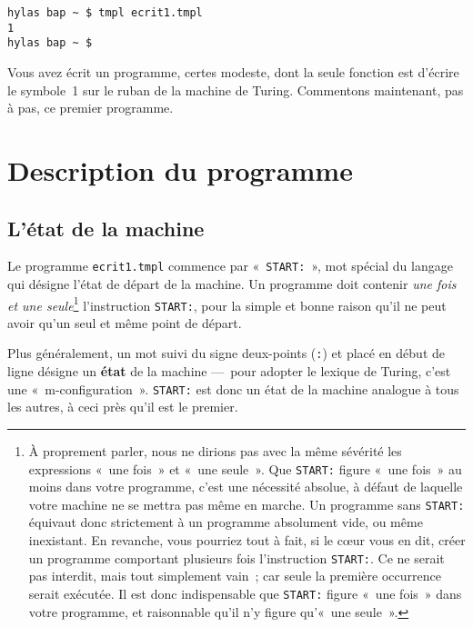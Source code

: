 \documentclass[a4paper, 11pt]{report}
\begin{document}
\begin{verbatim}
hylas bap ~ $ tmpl ecrit1.tmpl
1
hylas bap ~ $
\end{verbatim}

\par

Vous avez écrit un programme, certes modeste, dont la seule fonction est
d'écrire le symbole~1 sur le ruban de la machine de Turing.  Commentons
maintenant, pas à pas, ce premier programme.



\section{Description du programme}

\subsection{L'état de la machine}

Le programme \texttt{ecrit1.tmpl} commence par «~\verb+START:+~», mot
spécial du langage qui désigne l'état de départ de la machine. Un
programme doit contenir \emph{une fois et une seule}\footnote{À
  proprement parler, nous ne dirions pas avec la même sévérité les
  expressions «~une fois~» et «~une seule~». Que \texttt{START:} figure
  «~une fois~» au moins dans votre programme, c'est une nécessité
  absolue, à défaut de laquelle votre machine ne se mettra pas même en
  marche. Un programme sans \texttt{START:} équivaut donc strictement à
  un programme absolument vide, ou même inexistant. En revanche, vous
  pourriez tout à fait, si le cœur vous en dit, créer un programme
  comportant plusieurs fois l'instruction \texttt{START:}. Ce ne serait
  pas interdit, mais tout simplement vain~; car seule la première
  occurrence serait exécutée. Il est donc indispensable que
  \texttt{START:} figure «~une fois~» dans votre programme, et
  raisonnable qu'il n'y figure qu'«~une seule~».} l'instruction
\verb+START:+, pour la simple et bonne raison qu'il ne peut avoir qu'un
seul et même point de départ.

\par

Plus généralement, un mot suivi du signe deux-points (\texttt{:}) et
placé en début de ligne désigne un \textbf{état} de la machine ---~pour
adopter le lexique de Turing, c'est une
«~m-configuration~». \texttt{START:} est donc un état de la machine
analogue à tous les autres, à ceci près qu'il est le premier.
\end{document}
